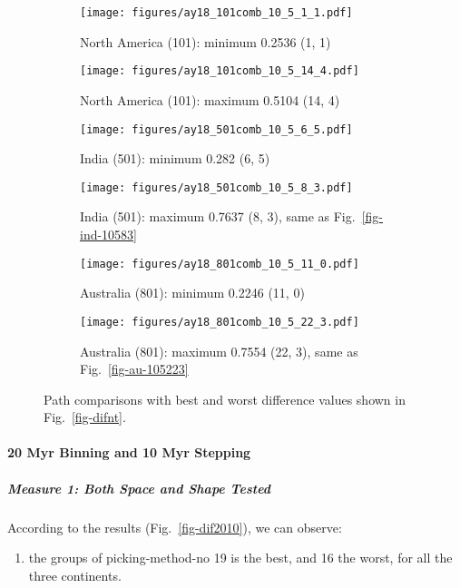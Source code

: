 \begin{figure*}
	\centering
	\begin{subfigure}{.42\textwidth}
		\texttt{[image: figures/ay18\_101comb\_10\_5\_1\_1.pdf]}
		\caption{North America (101): minimum 0.2536 (1, 1)}\label{fig-nant-10511}
	\end{subfigure}
	\begin{subfigure}{.42\textwidth}
		\texttt{[image: figures/ay18\_101comb\_10\_5\_14\_4.pdf]}
		\caption{North America (101): maximum 0.5104 (14, 4)}\label{fig-nant-105144}
	\end{subfigure}
	\vspace{.1em}
	\begin{subfigure}{.42\textwidth}
		\texttt{[image: figures/ay18\_501comb\_10\_5\_6\_5.pdf]}
		\caption{India (501): minimum 0.282 (6, 5)}\label{fig-indnt-10565}
	\end{subfigure}
	\begin{subfigure}{.42\textwidth}
		\texttt{[image: figures/ay18\_501comb\_10\_5\_8\_3.pdf]}
		\caption{India (501): maximum 0.7637 (8, 3), same as Fig.~\ref{fig-ind-10583}}\label{fig-indnt-10583}
	\end{subfigure}
	\vspace{.1em}
	\begin{subfigure}{.42\textwidth}
		\texttt{[image: figures/ay18\_801comb\_10\_5\_11\_0.pdf]}
		\caption{Australia (801): minimum 0.2246 (11, 0)}\label{fig-aunt-105110}
	\end{subfigure}
	\begin{subfigure}{.42\textwidth}
		\texttt{[image: figures/ay18\_801comb\_10\_5\_22\_3.pdf]}
		\caption{Australia (801): maximum 0.7554 (22, 3), same as Fig.~\ref{fig-au-105223}}\label{fig-aunt-105223}
	\end{subfigure}
	\caption[Best and worst differences without shape test (10 Myr bin, 5 Myr
step)]{Path comparisons with best and worst difference values shown in
Fig.~\ref{fig-difnt}.}\label{fig-difntbw}
\end{figure*}

\paragraph{20 Myr Binning and 10 Myr Stepping}

\subparagraph{Measure 1: Both Space and Shape Tested}

According to the results (Fig.~\ref{fig-dif2010}), we can observe:
%
\begin{enumerate}
  \item the groups of picking-method-no 19 is the best, and 16 the worst, for
        all the three continents.
\end{enumerate}


